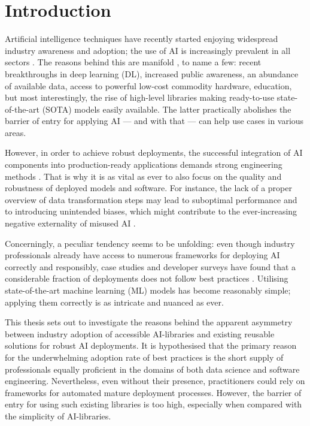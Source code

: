 \chapter{Introduction}

Artificial intelligence techniques have recently started enjoying widespread industry awareness and adoption; the use of AI is increasingly prevalent in all sectors \cite{wirtz2019artificial,bosch2021engineering}. The reasons behind this are manifold \cite{jordan2015machine}, to name a few: recent breakthroughs in deep learning (DL), increased public awareness, an abundance of available data, access to powerful low-cost commodity hardware, education, but most interestingly, the rise of high-level libraries making ready-to-use state-of-the-art (SOTA) models easily available. The latter practically abolishes the barrier of entry for applying AI --- and with that --- can help use cases in various areas. 

However, in order to achieve robust deployments, the successful integration of AI components into production-ready applications demands strong engineering methods \cite{serban2020adoption}. That is why it is as vital as ever to also focus on the quality and robustness of deployed models and software. For instance, the lack of a proper overview of data transformation steps may lead to suboptimal performance and to introducing unintended biases, which might contribute to the ever-increasing negative externality of misused AI \cite{o2016weapons}.

Concerningly, a peculiar tendency seems to be unfolding: even though industry professionals already have access to numerous frameworks for deploying AI correctly and responsibly, case studies and developer surveys have found that a considerable fraction of deployments does not follow best practices \cite{serban2020adoption,haakman2021ai,amershi2019software,de2019understanding,sculley2015hidden}. Utilising state-of-the-art machine learning (ML) models has become reasonably simple; applying them correctly is as intricate and nuanced as ever. 

This thesis sets out to investigate the reasons behind the apparent asymmetry between industry adoption of accessible AI-libraries and existing reusable solutions for robust AI deployments. It is hypothesised that the primary reason for the underwhelming adoption rate of best practices is the short supply of professionals equally proficient in the domains of both data science and software engineering. Nevertheless, even without their presence, practitioners could rely on frameworks for automated mature deployment processes. However, the barrier of entry for using such existing libraries is too high, especially when compared with the simplicity of AI-libraries.

